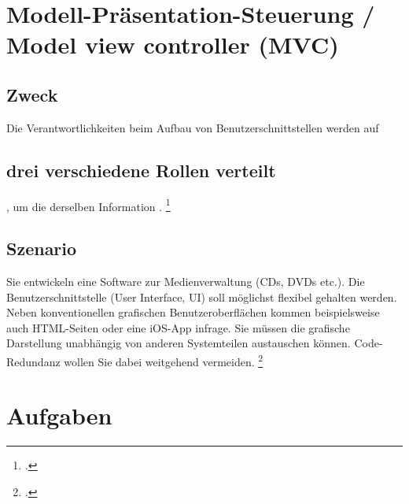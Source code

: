 \documentclass{lehramt-informatik}
\begin{document}

\chapter{Modell-Präsentation-Steuerung / Model view controller (MVC)}

\begin{quellen}
\item \cite{wiki:mvc}
\item \cite[Kapitel „Observer“, Seite 256]{gof}
\item \cite[Kapitel 5.6, Seite 92-95]{eilebrecht}
\item \cite[Kapitel 3.8, Seite 48-49]{siebler}
\end{quellen}

%

\section{Zweck}

Die Verantwortlichkeiten beim Aufbau von Benutzerschnittstellen werden
auf \section{drei verschiedene Rollen verteilt}, um die
 derselben Information .
\footcite[Seite 92]{eilebrecht}

%

\section{Szenario}

Sie entwickeln eine Software zur Medienverwaltung (CDs, DVDs etc.). Die
Benutzerschnittstelle (User Interface, UI) soll möglichst flexibel
gehalten werden. Neben konventionellen grafischen Benutzeroberflächen
kommen beispielsweise auch HTML-Seiten oder eine iOS-App infrage. Sie
müssen die grafische Darstellung unabhängig von anderen Systemteilen
austauschen können. Code-Redundanz wollen Sie dabei weitgehend
vermeiden.
\footcite[Seite 92]{eilebrecht}


\chapter{Aufgaben}

\literatur
\end{document}
